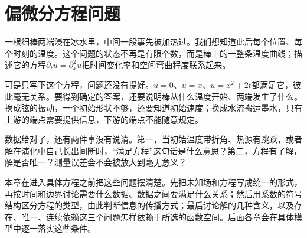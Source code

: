 \chapter{偏微分方程问题}
\label{chap:pde-problems}

一根细棒两端浸在冰水里，中间一段事先被加热过。我们想知道此后每个位置、每个时刻的温度。这个问题的状态不再是有限个数，而是棒上的一整条温度曲线；描述它的方程$\partial_tu=\partial_x^2u$把时间变化率和空间弯曲程度联系起来。

可是只写下这个方程，问题还没有提好。$u=0$、$u=x$、$u=x^2+2t$都满足它，彼此毫无关系。要得到确定的答案，还要说明棒从什么温度开始、两端发生了什么。换成弦的振动，一个初始形状不够，还要知道初始速度；换成水流搬运墨水，只有上游的端点需要提供信息，下游的端点不能随意规定。

数据给对了，还有两件事没有说清。第一，当初始温度带折角、热源有跳跃，或者解在演化中自己长出间断时，“满足方程”这句话是什么意思？第二，方程有了解，解是否唯一？测量误差会不会被放大到毫无意义？

本章在进入具体方程之前把这些问题摆清楚。先把未知场和方程写成统一的形式，再按时间和边界讨论需要什么数据、数据之间要满足什么关系；然后用系数的符号结构区分方程的类型，由此判断信息的传播方式；最后讨论解的几种含义，以及存在、唯一、连续依赖这三个问题怎样依赖于所选的函数空间。后面各章会在具体模型中逐一落实这些条件。







